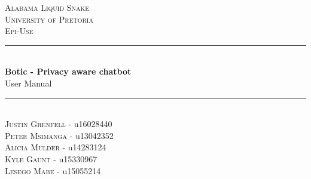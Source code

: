 \documentclass[11pt]{article}
\begin{document}
\begin{titlepage}
	\newcommand{\HRule}{\rule{\linewidth}{0.5mm}}
    \begin{center}

    	\textsc{\LARGE Alabama Liquid Snake}\\[0.8cm]
    	\textsc{\Large University of Pretoria}\\[0.5cm]
    	\textsc{\large Epi-Use}\\[0.5cm]

    	\HRule\\[0.4cm]

    	{\huge\bfseries Botic - Privacy aware chatbot}\\[0.2cm]

    	{\huge User Manual}\\[0.2cm]

    	\HRule\\[0.5cm]

	    \textsc{Justin Grenfell} - u16028440 \\[0cm]
	    \textsc{Peter Msimanga} - u13042352 \\[0cm]
	    \textsc{Alicia Mulder} - u14283124 \\[0cm]
	    \textsc{Kyle Gaunt} - u15330967 \\[0cm]
	    \textsc{Lesego Mabe} - u15055214 \\[0cm]

    \end{center}
\end{titlepage}
\tableofcontents
\newpage
\end{document}
